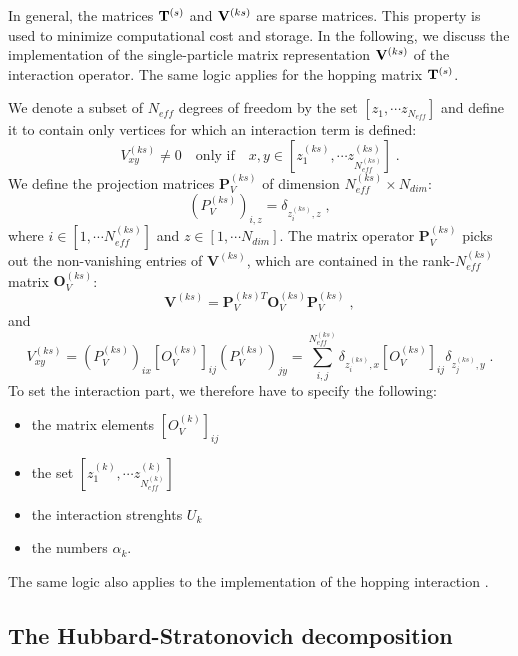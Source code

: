 In general, the matrices ${\bf T}^{(s)}$ and ${\bf V}^{(ks)}$ are sparse matrices. 
This property is used to minimize computational cost and storage.
In the following, we discuss the implementation of the single-particle matrix representation ${\bf V}^{(ks)}$ of the interaction operator. 
The same logic applies for the hopping matrix ${\bf T}^{(s)}$.

We denote a subset of $N_{eff}$  degrees of freedom  by the set  $[z_{1},\cdots  z_{N_{eff}}]$ and define it to contain only vertices for which an interaction term is defined:
\begin{equation}
V^{(ks)}_{x y}\neq 0\quad \text{only if} \quad x,y \in [z_{1}^{(ks)},\cdots  z_{N_{eff}^{(ks)}}^{(ks)}]\;.
\end{equation}
We define the projection matrices $\mathbf{P}^{(ks)}_{V}$ of dimension $N_{eff}^{(ks)}\times N_{dim}$:
\begin{equation}
(P_{V}^{(ks)})_{i,z}=\delta_{z_{i}^{(ks)},z}\;,
\end{equation}
where $i\in [1,\cdots N_{eff}^{(ks)}]$ and $z\in [1,\cdots N_{dim}]$. The matrix operator $\bm{P}^{(ks)}_{V}$ picks out the non-vanishing entries of $\bm{V}^{(ks)}$, 
which are contained in the rank-$N_{eff}^{(ks)}$  matrix $\bm{O}_{V}^{(ks)}$:
\begin{equation}
\bm{V}^{(ks)}=\bm{P}^{(ks) T}_{V} \bm{O}_{V}^{(ks)}\bm{P}^{(ks)}_{V}\;,
\end{equation}
and
\begin{equation}
V_{xy}^{(ks)}=(P^{(ks)}_{V})_{ix} \left[O_{V}^{(ks)}\right]_{ij}(P_{V}^{(ks)})_{jy}=\sum\limits_{i,j}^{N_{eff}^{(ks)}} \delta_{z_{i}^{(ks)},x}  \left[O_{V}^{(ks)}\right]_{ij} \delta_{z_{j}^{(ks)},y} \;.
\end{equation}
To set the  interaction part, we therefore have to specify the following:
\begin{itemize}
\item the matrix elements $\left[O_{V}^{(k)}\right]_{ij}$
\item the set $[z_{1}^{(k)},\cdots  z_{N_{eff}^{(k)}}^{(k)}]$ 
\item the interaction strenghts $U_{k}$
\item the numbers  $\alpha_{k}$.
\end{itemize}

The same logic also applies to the implementation of the hopping interaction .

\subsection{The Hubbard-Stratonovich decomposition}

